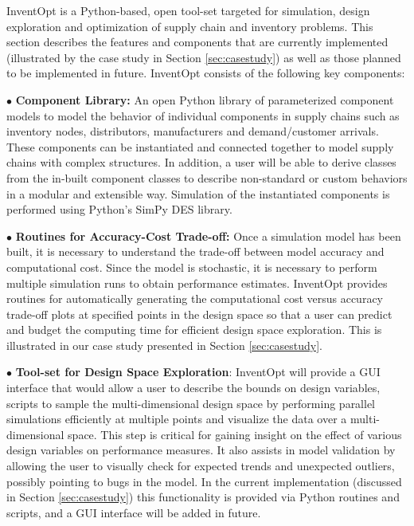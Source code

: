 InventOpt is a Python-based, open tool-set targeted for simulation, design exploration and optimization of supply chain and inventory problems. This section describes the features and components that are currently implemented (illustrated by the case study in Section \ref{sec:casestudy}) as well as those planned to be implemented in future. InventOpt consists of the following key components:

    \vspace{0.2em}
    \noindent $\bullet$ \textbf{Component Library:} An open Python library of parameterized component models to model the behavior of individual components in supply chains such as inventory nodes, distributors, manufacturers and demand/customer arrivals. These components can be instantiated and connected together  to model supply chains with complex structures. In addition, a user will be able to derive classes from the in-built component classes to describe non-standard or custom behaviors in a modular and extensible way. Simulation of the instantiated components is performed using Python's SimPy DES library.
     
     \vspace{0.2em}\noindent $\bullet$ \textbf{Routines for Accuracy-Cost Trade-off:} Once a simulation model has been built, it is necessary to understand the trade-off between model accuracy and computational cost. Since the model is stochastic, it is necessary to perform multiple simulation runs to obtain performance estimates. InventOpt provides routines for automatically generating the computational cost versus accuracy trade-off plots at specified points in the design space so that a user can predict and budget the computing time for efficient design space exploration. This is illustrated in our case study presented in Section \ref{sec:casestudy}.
    
     \vspace{0.2em}\noindent $\bullet$ \textbf{Tool-set for Design Space Exploration}: InventOpt will provide a GUI interface that would allow a user to describe the bounds on design variables, scripts to sample the multi-dimensional design space by performing parallel simulations efficiently at multiple points and visualize the data over a multi-dimensional space. This step is critical for gaining insight on the effect of various design variables on performance measures. It also assists in model validation by allowing the user to visually check for expected trends and unexpected outliers, possibly pointing to bugs in the model. In the current implementation (discussed in Section \ref{sec:casestudy}) this functionality is provided via Python routines and scripts, and a GUI interface will be added in future. 
     
